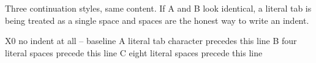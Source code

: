 \documentclass[bib]{statapress}
\begin{document}
\noindent Three continuation styles, same content. If A and B look identical,
a literal tab is being treated as a single space and spaces are the honest
way to write an indent.

\begin{stlog}[beamer]
X0 no indent at all -- baseline
	A literal tab character precedes this line
    B four literal spaces precede this line
        C eight literal spaces precede this line
\end{stlog}
\end{document}
